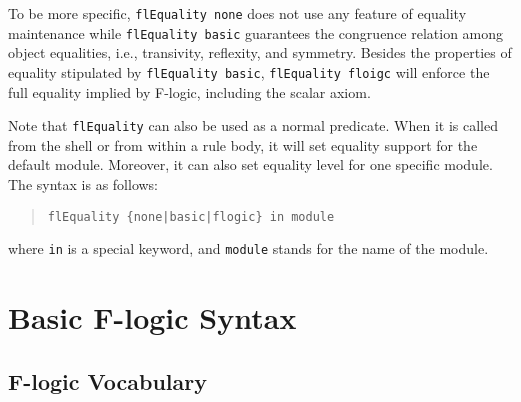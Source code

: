 \documentclass[11pt]{article}
\newcommand{\fl}{\mbox{F-logic}\xspace}
\begin{document}
To be more specific, \mbox{\tt flEquality none} does not use any feature of
equality maintenance while \mbox{\tt flEquality basic} guarantees the
congruence relation among object equalities, i.e., transivity, reflexity,
and symmetry. Besides the properties of equality stipulated by
\mbox{\tt flEquality basic}, \mbox{\tt flEquality floigc} will enforce the full
equality implied by \fl, including the scalar axiom.

Note that {\tt flEquality} can also be used as a normal predicate. When it
is called from the shell or from within a rule body, it will set equality
support for the default module. Moreover, it can also set equality level
for one specific module. The syntax is as follows:
\begin{quote}
\verb!flEquality {none|basic|flogic} in module!
\end{quote}
where {\tt in} is a special keyword, and {\tt module} stands for the name of
the module.


\section{Basic \fl Syntax}


\subsection{\fl Vocabulary}\label{sec-basic-flogic}
\end{document}
